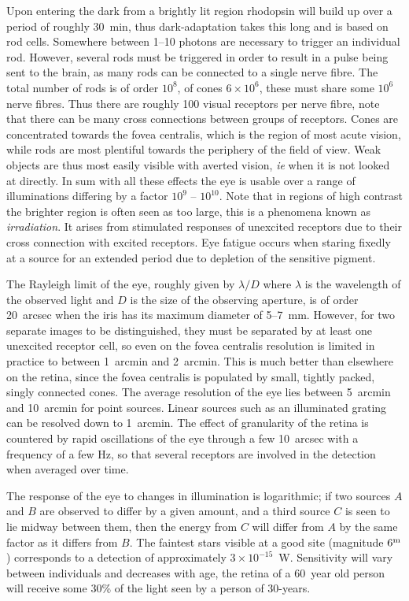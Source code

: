 \documentclass{article}
\begin{document}
Upon entering the dark from a brightly lit region rhodopsin will build
up over a period of roughly 30~min, thus dark-adaptation takes this
long and is based on rod cells. Somewhere between 1--10 photons are
necessary to trigger an individual rod. However, several rods must be
triggered in order to result in a pulse being sent to the brain, as
many rods can be connected to a single nerve fibre. The total number
of rods is of order $10^8$, of cones $6\times 10^6$, these must share
some $10^6$ nerve fibres. Thus there are roughly 100 visual receptors
per nerve fibre, note that there can be many cross connections between
groups of receptors. Cones are concentrated towards the fovea
centralis, which is the region of most acute vision, while rods are
most plentiful towards the periphery of the field of view. Weak
objects are thus most easily visible with averted vision, {\it ie}
when it is not looked at directly. In sum with all these effects the
eye is usable over a range of illuminations differing by a factor
$10^9$ -- $10^{10}$. Note that in regions of high contrast the
brighter region is often seen as too large, this is a phenomena known
as {\it irradiation}. It arises from stimulated responses of unexcited
receptors due to their cross connection with excited receptors. Eye
fatigue occurs when staring fixedly at a source for an extended period
due to depletion of the sensitive pigment.

The Rayleigh limit of the eye, roughly given by $\lambda/D$ where
$\lambda$ is the wavelength of the observed light and $D$ is the size
of the observing aperture, is of order 20~arcsec when the iris has
its maximum diameter of 5--7~mm. However, for two separate images to
be distinguished, they must be separated by at least one unexcited 
receptor cell, so even on the fovea centralis resolution is limited in
practice to between 1~arcmin and 2~arcmin. This is much better than
elsewhere on the retina, since the fovea centralis is populated by
small, tightly packed, singly connected cones. The average resolution
of the eye lies between 5~arcmin and 10~arcmin for point sources. Linear
sources such as an illuminated grating can be resolved down to 1~arcmin.  
The effect of granularity of the retina is countered by rapid oscillations of the
eye through a few 10~arcsec with a frequency of a few Hz, so that
several receptors are involved in the detection when averaged over
time.

The response of the eye to changes in illumination is logarithmic; if
two sources $A$ and $B$ are observed to differ by a given amount, and a
third source $C$ is seen to lie midway between them, then the energy
from $C$ will differ from $A$ by the same factor as it differs from
$B$. The faintest stars visible at a good site (magnitude $6^{\rm m}$)
corresponds to a detection of approximately $3\times
10^{-15}$~W. Sensitivity will vary between individuals and decreases
with age, the retina of a 60~year old person will receive some 30\% of 
the light seen by a person of 30-years.
\end{document}

